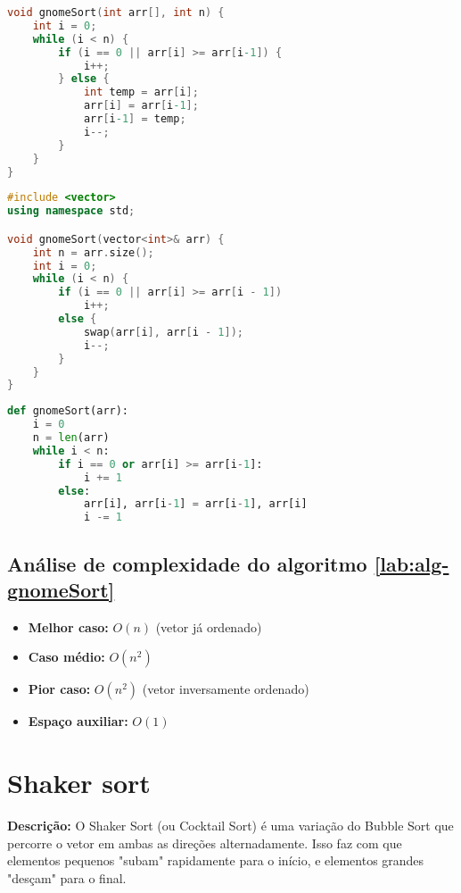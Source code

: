 \begin{lstlisting}[language=C,caption={Gnome sort em C},captionpos=t]
void gnomeSort(int arr[], int n) {
    int i = 0;
    while (i < n) {
        if (i == 0 || arr[i] >= arr[i-1]) {
            i++;
        } else {
            int temp = arr[i];
            arr[i] = arr[i-1];
            arr[i-1] = temp;
            i--;
        }
    }
}
\end{lstlisting}

\begin{lstlisting}[language=C++,caption={Gnome sort em C++},captionpos=t]
#include <vector>
using namespace std;

void gnomeSort(vector<int>& arr) {
    int n = arr.size();
    int i = 0;
    while (i < n) {
        if (i == 0 || arr[i] >= arr[i - 1])
            i++;
        else {
            swap(arr[i], arr[i - 1]);
            i--;
        }
    }
}
\end{lstlisting}

\begin{lstlisting}[language=python,caption={Gnome sort em Python},captionpos=t]
def gnomeSort(arr):
    i = 0
    n = len(arr)
    while i < n:
        if i == 0 or arr[i] >= arr[i-1]:
            i += 1
        else:
            arr[i], arr[i-1] = arr[i-1], arr[i]
            i -= 1
\end{lstlisting}

\subsection{Análise de complexidade do algoritmo \ref{lab:alg-gnomeSort}}
\begin{itemize}
    \item \textbf{Melhor caso:} $O(n)$ (vetor já ordenado)
    \item \textbf{Caso médio:} $O(n^2)$
    \item \textbf{Pior caso:} $O(n^2)$ (vetor inversamente ordenado)
    \item \textbf{Espaço auxiliar:} $O(1)$
\end{itemize}


\section{Shaker sort}
\textbf{Descrição:} O Shaker Sort (ou Cocktail Sort) é uma variação do Bubble Sort que percorre o vetor em ambas as direções alternadamente. Isso faz com que elementos pequenos "subam" rapidamente para o início, e elementos grandes "desçam" para o final.

